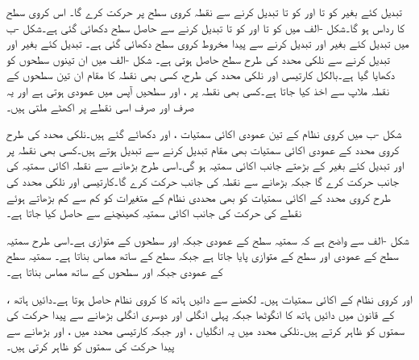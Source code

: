  تبدیل کئے بغیر  کو  تا  اور  کو  تا  تبدیل کرنے سے  نقطہ  کروی  سطح  پر حرکت کرے گا۔ اس کروی سطح کا رداس  ہو گا۔شکل -الف  میں  کو  تا  اور  کو  تا  تبدیل کرنے سے حاصل سطح  دکھائی گئی ہے۔شکل -ب میں  تبدیل کئے بغیر  اور  تبدیل کرنے سے پیدا مخروط    کروی سطح دکھائی گئی ہے۔ تبدیل کئے بغیر  اور  تبدیل کرنے سے  نلکی محدد کی طرح  سطح حاصل ہوتی ہے۔ شکل -الف میں ان تینوں سطحوں کو دکھایا گیا ہے۔بالکل کارتیسی اور نلکی محدد کی طرح، کسی بھی نقطہ  کا مقام ان تین سطحوں کے نقطہ ملاپ سے اخذ کیا جاتا ہے۔کسی بھی نقطہ  پر ،  اور  سطحیں آپس میں عمودی ہوتی ہے اور یہ صرف اور صرف اسی نقطے پر اکھٹے ملتی ہیں۔

شکل -ب میں کروی نظام کے تین عمودی اکائی سمتیات ،  اور  دکھائے گئے ہیں۔نلکی محدد کی طرح کروی محدد کے عمودی اکائی سمتیات بھی مقام تبدیل کرنے سے تبدیل ہوتے ہیں۔کسی بھی نقطہ  پر  اور  تبدیل کئے بغیر  کے بڑھتے جانب اکائی سمتیہ  ہو گی۔اسی طرح  بڑھانے سے نقطہ  اکائی سمتیہ  کی جانب حرکت کرے گا جبکہ  بڑھانے سے نقطہ  کی جانب حرکت کرے گا۔کارتیسی اور نلکی محدد کی طرح کروی محدد کے اکائی سمتیات کو بھی محددی نظام کے متغیرات کو کم سے کم بڑھاتے ہوئے  نقطے کی حرکت کی جانب اکائی سمتیہ کھینچنے سے حاصل کیا جاتا ہے۔

شکل -الف سے واضح ہے کہ  سمتیہ  سطح کے عمودی جبکہ  اور  سطحوں کے متوازی ہے۔اسی طرح  سمتیہ  سطح کے عمودی اور  سطح کے متوازی پایا جاتا ہے جبکہ  سطح کے ساتھ مماس بناتا ہے۔ سمتیہ  سطح کے عمودی جبکہ  اور  سطحوں کے ساتھ مماس بناتا ہے۔

 
،  اور  کروی نظام  کے اکائی سمتیات ہیں۔ لکھنے سے  دائیں ہاتھ کا کروی نظام حاصل ہوتا ہے۔دائیں ہاتھ کے قانون میں دائیں ہاتھ کا انگوٹھا   جبکہ پہلی انگلی   اور دوسری انگلی  بڑھانے سے پیدا حرکت کی سمتوں کو ظاہر کرتے ہیں۔نلکی محدد میں یہ انگلیاں ،  اور  جبکہ کارتیسی محدد میں ،  اور  بڑھانے سے پیدا حرکت کی سمتوں کو ظاہر کرتی ہیں۔

